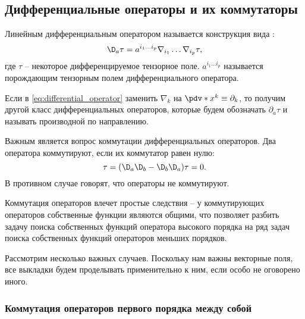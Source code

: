 %
%
%
%
%
%

\subsection{Дифференциальные операторы и их коммутаторы\label{sec:commutators}}

    Линейным дифференциальным оператором называется конструкция вида \cite{differential_operator_commutators}:
    \begin{equation}\label{eq:differential_operator}
        \D_a\tau = a^{i_1 \dots i_p} \nabla_{i_1} \dots \nabla_{i_p} \tau ,
    \end{equation}
    где $\tau$ -- некоторое дифференцируемое тензорное поле. $a^{i_1 \dots i_p}$ называется порождающим тензорным полем дифференциального оператора.

    Если в \autoref{eq:differential_operator} заменить $\nabla_k$ на $\pdv*{x^k} \equiv \partial_k$, то получим другой класс дифференциальных операторов, которые будем обозначать $\partial_a\tau$ и называть производной по направлению.

    Важным является вопрос коммутации дифференциальных операторов. Два оператора коммутируют, если их коммутатор равен нулю:
    \begin{equation}
        [\D_a, \D_b]\tau = (\D_a \D_b - \D_b \D_a) \tau = 0 .
    \end{equation}
    В противном случае говорят, что операторы не коммутируют.

    Коммутация операторов влечет простые следствия -- у коммутирующих операторов собственные функции являются общими, что позволяет разбить задачу поиска собственных функций оператора высокого порядка на ряд задач поиска собственных функций операторов меньших порядков.

    Рассмотрим несколько важных случаев. Поскольку нам важны векторные поля, все выкладки будем проделывать применительно к ним, если особо не оговорено иного.


    \subsubsection{Коммутация операторов первого порядка между собой}

